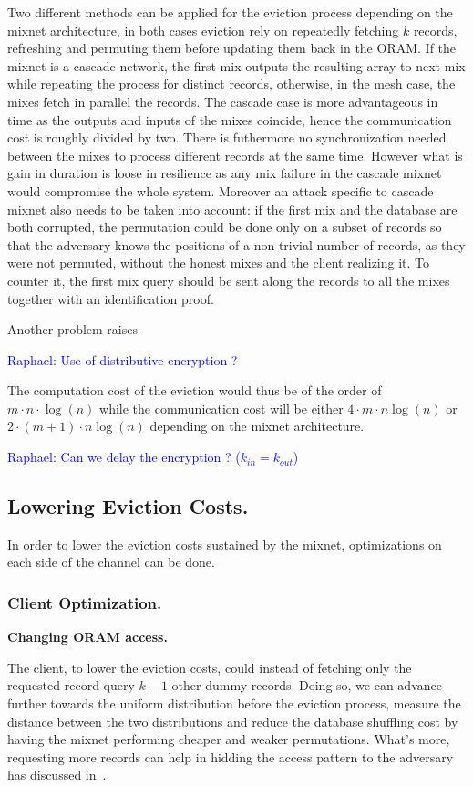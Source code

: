 \documentclass[conference]{IEEEtran}
\newcommand{\raphael}[1]{\textcolor{blue}{Raphael: #1}}
\begin{document}
Two different methods can be applied for the eviction process depending on the mixnet architecture, in both cases eviction rely on repeatedly fetching $k$ records, refreshing and permuting them before updating them back in the ORAM.
If the mixnet is a cascade network, the first mix outputs the resulting array to next mix while repeating the process for distinct records, otherwise, in the mesh case, the mixes fetch in parallel the records.
The cascade case is more advantageous in time as the outputs and inputs of the mixes coincide, hence the communication cost is roughly divided by two. There is futhermore no synchronization needed between the mixes to process different records at the same time.
However what is gain in duration is loose in resilience as any mix failure in the cascade mixnet would compromise the whole system. Moreover an attack specific to cascade mixnet also needs to be taken into account: if the first mix and the database are both corrupted, the permutation could be done only on a subset of records
so that the adversary knows the positions of a non trivial number of records, as they were not permuted, without the honest mixes and the client realizing it. To counter it, the first mix query should be sent along the records to all the mixes together with an identification proof.

Another problem raises

\raphael{Use of distributive encryption ?}

The computation cost of the eviction would thus be of the order of $m\cdot n \cdot \log(n)$ while the communication cost will be either $4\cdot m \cdot n \log(n)$ or $2\cdot(m+1) \cdot n \log(n)$ depending on the mixnet architecture.

\raphael{Can we delay the encryption ? ($k_{in}=k_{out}$)}

\subsection{Lowering Eviction Costs.}

In order to lower the eviction costs sustained by the mixnet, optimizations on each side of the channel can be done.

\subsubsection{Client Optimization.}
\noindent\textbf{Changing ORAM access.}

The client, to lower the eviction costs, could instead of fetching only the requested record query $k-1$ other dummy records. Doing so, we can advance further towards the uniform distribution before the eviction process, measure the distance between the two distributions and reduce the database shuffling cost by having the mixnet performing cheaper and weaker permutations.
What's more, requesting more records can help in hidding the access pattern to the adversary has discussed in~\cite{Lower cost PIR}.
\end{document}
